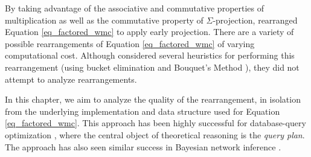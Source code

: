 By taking advantage of the associative and commutative properties of multiplication as well as the commutative property of $\Sigma$-projection, \cite{DPV20} rearranged Equation \eqref{eq_factored_wmc} to apply early projection.
There are a variety of possible rearrangements of Equation \eqref{eq_factored_wmc} of varying computational cost.
Although \cite{DPV20} considered several heuristics for performing this rearrangement (using bucket elimination \cite{dechter99} and Bouquet's Method \cite{bouquet1999gestion}), they did not attempt to analyze rearrangements.

In this chapter, we aim to analyze the quality of the rearrangement, in isolation from the underlying implementation and data structure used for Equation \eqref{eq_factored_wmc}.
This approach has been highly successful for database-query optimization \cite{MPPV04}, where the central object of theoretical reasoning is the \emph{query plan}.
The approach has also seen similar success in Bayesian network inference \cite{darwiche1998dynamic}.

